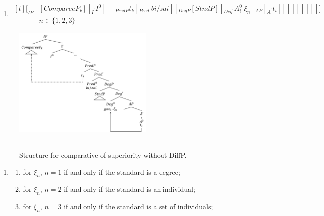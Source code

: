 \documentclass{ctexart}
\begin{document}
\begin{enumerate}
    \item \label{superiority_structure}
    $\begin{aligned}[t]
        [_{IP} &[CompareeP_k] [_{I^{\prime}} I^{0} [_{...}[_{PredP} t_k [_{Pred'} bi/zai [[_{DegP} [StndP] [_{Deg^{\prime}} A_i^0\mbox{-}\xi_{n} [_{AP} [_{A^{\prime}} t_i]]]]]]]]]] \\ 
        &n \in \{1, 2, 3\}
    \end{aligned}$
\end{enumerate}

\begin{figure}[H]
    \centering
    \includegraphics[width=0.6\textwidth]{Pic/superiority_structure.png}
    \begin{caption}
        \\ \vspace{-1.1ex}
        Structure for comparative of superiority without DiffP.
    \end{caption}
\end{figure}

\begin{enumerate}
    \item \label{superiority_example_2}
    \begin{enumerate}
        \item \label{superiority_example_2_a}
        for $\xi_n$, $n=1$ if and only if the standard is a degree;

        \item \label{superiority_example_2_b}
        for $\xi_n$, $n=2$ if and only if the standard is an individual;

        \item \label{superiority_example_2_c}
        for $\xi_n$, $n=3$ if and only if the standard is a set of individuals;

    \end{enumerate}
\end{enumerate}
\end{document}
